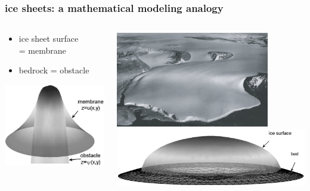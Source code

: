 \documentclass[hide notes,intlimits]{beamer}
\begin{document}
\begin{frame}
  \frametitle{ice sheets: a mathematical modeling analogy}

\begin{columns}
\begin{column}{0.35\textwidth}
\begin{itemize}
\item ice sheet surface \\ = \alert{membrane}
\item bedrock = \alert{obstacle}
\end{itemize}
\vfill
\begin{center}
\includegraphics[width=1.1\textwidth]{classicalobs}
\end{center}
\end{column}
\begin{column}{0.65\textwidth}
\begin{center}
\includegraphics[width=0.8\textwidth]{polaris} \\
\includegraphics[width=\textwidth]{capnonflatobs}
\end{center}
\end{column}
\end{columns}
\end{frame}
\end{document}
